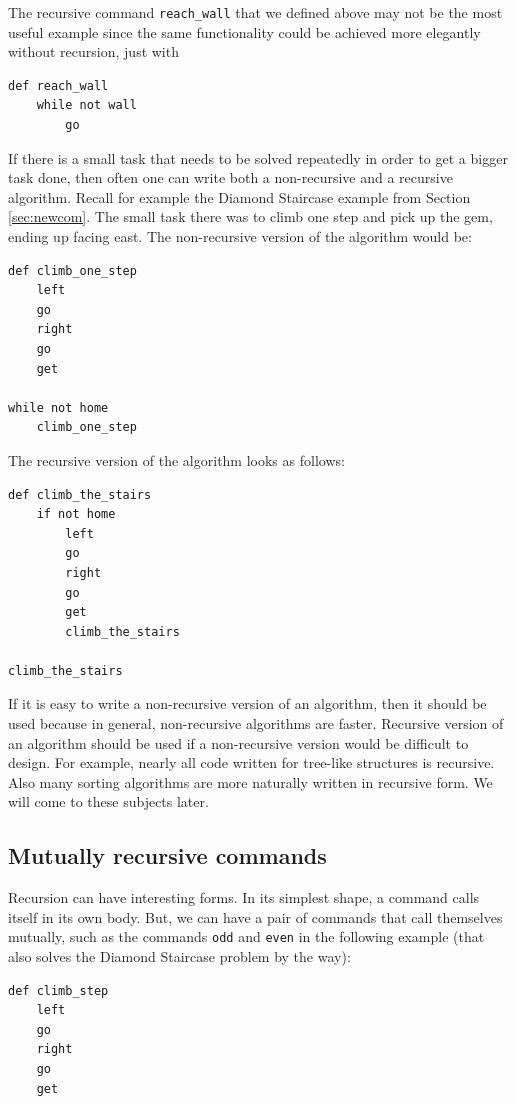 {{{{The recursive command {\tt reach\_wall} that we defined above may not be the most useful example 
since the same functionality could be achieved more elegantly without recursion, just with

\begin{verbatim}
def reach_wall
    while not wall
        go
\end{verbatim}
If there is a small task that needs to be solved repeatedly in order to get a bigger task done,
then often one can write both a non-recursive and a recursive algorithm. Recall for example the Diamond
Staircase example from Section \ref{sec:newcom}. The small task there was to climb one step and pick 
up the gem, ending up facing east. The non-recursive version of the algorithm would be:

\begin{verbatim}
def climb_one_step
    left
    go
    right
    go
    get

while not home
    climb_one_step
\end{verbatim}
The recursive version of the algorithm looks as follows:

\begin{verbatim}
def climb_the_stairs
    if not home
        left
        go
        right
        go
        get
        climb_the_stairs

climb_the_stairs
\end{verbatim}
If it is easy to write a non-recursive version of an algorithm, then it should be used
because in general, non-recursive algorithms are faster. 
Recursive version of an algorithm should be used if a non-recursive version would 
be difficult to design. For example, nearly all code written for tree-like structures 
is recursive. Also many sorting algorithms are more naturally written in recursive form.
We will come to these subjects later.

\subsection{Mutually recursive commands}

Recursion can have interesting forms. In its simplest shape, a command 
calls itself in its own body. But, we can have a pair of commands
that call themselves mutually, such as the commands {\tt odd} and 
{\tt even} in the following example (that also solves the Diamond Staircase
problem by the way):
 
\begin{verbatim}
def climb_step
    left
    go
    right
    go
    get 


\end{verbatim}}}}}
